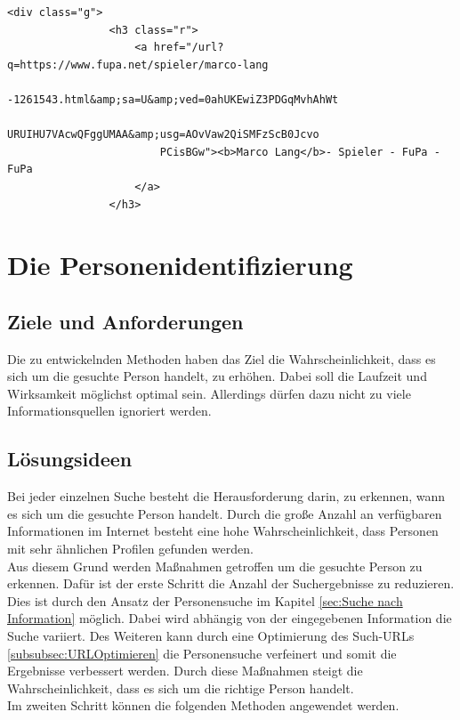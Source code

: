 			\begin{lstlisting}[caption=Ausschnitt des Quelltextes von einem einem Google-Suchergebnis \cite{suchergebnisseMarco},label={lst:GoogleSeitenquelltext}]
			<div class="g">
				<h3 class="r">
					<a href="/url?q=https://www.fupa.net/spieler/marco-lang
						-1261543.html&amp;sa=U&amp;ved=0ahUKEwiZ3PDGqMvhAhWt
						URUIHU7VAcwQFggUMAA&amp;usg=AOvVaw2QiSMFzScB0Jcvo
						PCisBGw"><b>Marco Lang</b>- Spieler - FuPa - FuPa
					</a>
				</h3>	
			\end{lstlisting} 
			
\section{Die Personenidentifizierung}
	\subsection{Ziele und Anforderungen}
	Die zu entwickelnden Methoden haben das Ziel die Wahrscheinlichkeit, dass es sich um die gesuchte Person handelt, zu erhöhen. Dabei soll die Laufzeit und Wirksamkeit möglichst optimal sein. Allerdings dürfen dazu nicht zu viele Informationsquellen ignoriert werden.
	
	\subsection{Lösungsideen}
	\label{sec:WannhandeltessichumdiegesuchtePerson}
	Bei jeder einzelnen Suche besteht die Herausforderung darin, zu erkennen, wann es sich um die gesuchte Person handelt. Durch die große Anzahl an verfügbaren Informationen im Internet besteht eine hohe Wahrscheinlichkeit, dass Personen mit sehr ähnlichen Profilen gefunden werden.\\
	Aus diesem Grund werden Maßnahmen getroffen um die gesuchte Person zu erkennen. Dafür ist der erste Schritt die Anzahl der Suchergebnisse zu reduzieren. Dies ist durch den Ansatz der Personensuche im Kapitel \ref{sec:Suche nach Information} möglich. Dabei wird abhängig von der eingegebenen Information die Suche variiert. Des Weiteren kann durch eine Optimierung des Such-URLs \ref{subsubsec:URLOptimieren} die Personensuche verfeinert und somit die Ergebnisse verbessert werden. Durch diese Maßnahmen steigt die Wahrscheinlichkeit, dass es sich um die richtige Person handelt.\\
	Im zweiten Schritt können die folgenden Methoden angewendet werden.

